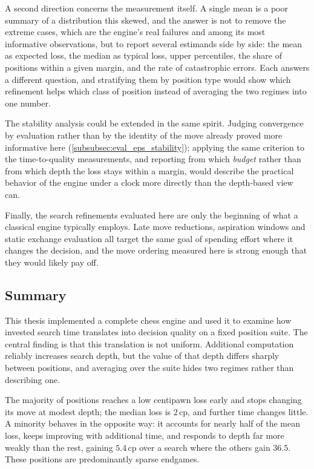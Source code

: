 A second direction concerns the measurement itself. A single mean is a poor
summary of a distribution this skewed, and the answer is not to remove the
extreme cases, which are the engine's real failures and among its most
informative observations, but to report several estimands side by side: the mean
as expected loss, the median as typical loss, upper percentiles, the share of
positions within a given margin, and the rate of catastrophic errors. Each
answers a different question, and stratifying them by position type would show
which refinement helps which class of position instead of averaging the two
regimes into one number.

The stability analysis could be extended in the same spirit. Judging convergence
by evaluation rather than by the identity of the move already proved more
informative here (\cref{subsubsec:eval_eps_stability}); applying the same
criterion to the time-to-quality measurements, and reporting from which
\emph{budget} rather than from which depth the loss stays within a margin, would
describe the practical behavior of the engine under a clock more directly than
the depth-based view can.

Finally, the search refinements evaluated here are only the beginning of what a
classical engine typically employs. Late move reductions, aspiration windows and
static exchange evaluation all target the same goal of spending effort where it
changes the decision, and the move ordering measured here is strong enough that
they would likely pay off.

\subsection{Summary}

This thesis implemented a complete chess engine and used it to examine how
invested search time translates into decision quality on a fixed position suite.
The central finding is that this translation is not uniform. Additional
computation reliably increases search depth, but the value of that depth differs
sharply between positions, and averaging over the suite hides two regimes rather
than describing one.

The majority of positions reaches a low centipawn loss early and stops changing
its move at modest depth; the median loss is $2$\,cp, and further time changes
little. A minority behaves in the opposite way: it accounts for nearly half of the
mean loss, keeps improving with additional time, and responds to depth far more
weakly than the rest, gaining $5.4$\,cp over a search where the others gain
$36.5$. These positions are predominantly sparse endgames.


